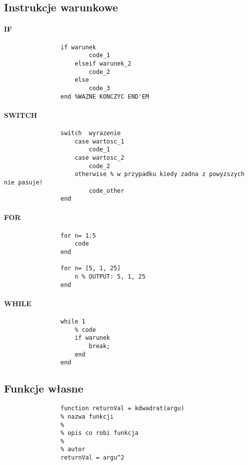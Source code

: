 \documentclass[16pt]{article}
\begin{document}
        \subsection*{Instrukcje warunkowe}
            \paragraph*{IF}
            \begin{lstlisting}
                if warunek
                        code_1
                    elseif warunek_2
                        code_2
                    else
                        code_3
                end %WAZNE KONCZYC END'EM
            \end{lstlisting}
            \paragraph*{SWITCH}
            \begin{lstlisting}
                switch  wyrazenie
                    case wartosc_1
                        code_1
                    case wartosc_2
                        code_2
                    otherwise % w przypadku kiedy zadna z powyzszych nie pasuje!
                        code_other
                end
            \end{lstlisting}
            \paragraph*{FOR}
            \begin{lstlisting}
                for n= 1:5
                    code
                end

                for n= [5, 1, 25]
                    n % OUTPUT: 5, 1, 25
                end
            \end{lstlisting}
            \paragraph*{WHILE}
            \begin{lstlisting}
                while 1
                    % code
                    if warunek
                        break;
                    end
                end
            \end{lstlisting}
        \subsection*{Funkcje własne}
            \begin{lstlisting}
                function returnVal = kdwadrat(argu)
                % nazwa funkcji
                % 
                % opis co robi funkcja
                %
                % autor 
                returnVal = argu^2

            \end{lstlisting}
\end{document}
